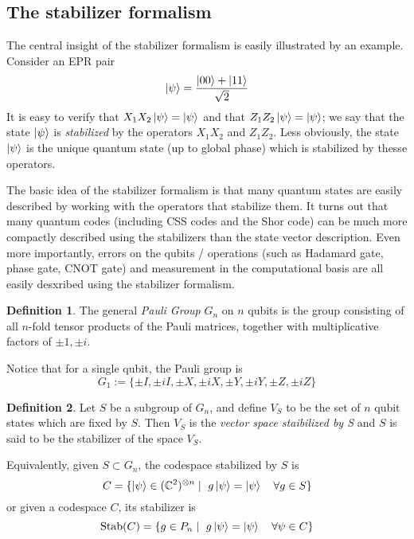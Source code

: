 \documentclass[11pt,a4paper]{article}
\theoremstyle{definition}
\newtheorem{definition}{Definition}[section]
\theoremstyle{plain}
\theoremstyle{remark}
\begin{document}
\subsection{The stabilizer formalism} 
The central insight of the stabilizer formalism is easily illustrated by an example. Consider an EPR pair 
$$\ket{\psi} = \frac{\ket{00} + \ket{11}}{\sqrt{2}}$$
It is easy to verify that $X_1 X_2 \ket{\psi} = \ket{\psi}$ and that $Z_1 Z_2 \ket{\psi} = \ket{\psi}$; we say that the 
state $\ket{\psi}$ is \emph{stabilized} by the operators $X_1 X_2$ and $Z_1 Z_2$. Less obviously, 
the state $\ket{\psi}$ is the unique quantum state (up to global phase) which is stabilized by thesse operators. 

The basic idea of the stabilizer formalism is that many quantum states are easily described by working with the operators 
that stabilize them. It turns out that many quantum codes (including CSS codes and the Shor code) can be much more compactly described 
using the stabilizers than the state vector description. Even more importantly, errors on the qubits / operations
(such as Hadamard gate, phase gate, CNOT gate) and measurement in the computational basis are all easily desxribed using the 
stabilizer formalism. 

\begin{definition}
    The general \emph{Pauli Group} $G_n$ on $n$ qubits is the group consisting of all $n$-fold tensor 
    products of the Pauli matrices, together with multiplicative factors of $\pm 1, \pm i$.

    Notice that for a single qubit, the Pauli group is 
    $$G_1 := \{\pm I, \pm i I, \pm X, \pm i X, \pm Y, \pm iY, \pm Z, \pm iZ\}$$
\end{definition}

\begin{definition}
    Let $S$ be a subgroup of $G_n$, and define $V_S$ to be the set of 
    $n$ qubit states which are fixed by $S$. Then $V_S$ is the \emph{vector space staibilized by S} and $S$ is said 
    to be the stabilizer of the space $V_S$. 

    Equivalently, given $S \subset G_n$, the codespace stabilized by $S$ is 
    $$C = \{\ket{\psi} \in (\mathbb{C}^2)^{\otimes n} \mid \ g \ket{\psi} = \ket{\psi} \quad \forall g \in S\}$$
    or given a codespace $C$, its stabilizer is 
    $$\operatorname{Stab}(C) = \{g \in P_n \mid \ g \ket{\psi} = \ket{\psi} \quad \forall \psi \in C\}$$
\end{definition}
\end{document}

